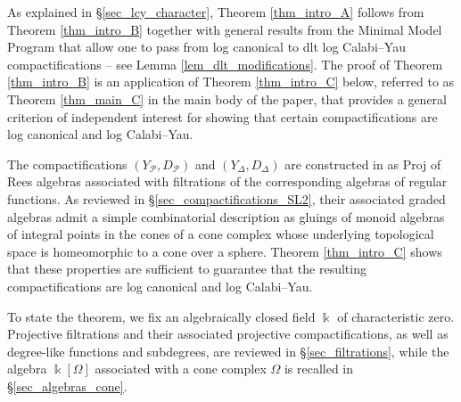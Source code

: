 \documentclass[12pt,letterpaper, reqno]{amsart}
\theoremstyle{defstyle} \newtheorem{definition}[theorem]{Definition}
\theoremstyle{remark}
\numberwithin{equation}{section}
\numberwithin{figure}{section}
\newcommand{\kk} {\Bbbk}
\newcommand{\cP} {\mathcal{P}}
\begin{document}
As explained in \S\ref{sec_lcy_character}, Theorem \ref{thm_intro_A} follows from Theorem \ref{thm_intro_B} together with general results from the Minimal Model Program that allow one to pass from log canonical to dlt log Calabi--Yau compactifications -- see Lemma \ref{lem_dlt_modifications}. The proof of Theorem \ref{thm_intro_B} is an application of Theorem \ref{thm_intro_C} below, referred to as Theorem \ref{thm_main_C} in the main body of the paper, that provides a general criterion of independent interest for showing that certain compactifications are log canonical and log Calabi--Yau.

The compactifications $(Y_\cP,D_\cP)$ and $(Y_\Delta,D_\Delta)$ are constructed in \cite{ayilliath2025geometric, farajzadeh2023compactifications} as Proj of Rees algebras associated with filtrations of the corresponding algebras of regular functions. As reviewed in \S\ref{sec_compactifications_SL2}, their associated graded algebras admit a simple combinatorial description as gluings of monoid algebras of integral points in the cones of a cone complex whose underlying topological space is homeomorphic to a cone over a sphere. Theorem \ref{thm_intro_C} shows that these properties are sufficient to guarantee that the resulting compactifications are log canonical and log Calabi--Yau.

To state the theorem, we fix an algebraically closed field $\kk$ of characteristic zero. Projective filtrations and their associated projective compactifications, as well as degree-like functions and subdegrees, are reviewed in \S\ref{sec_filtrations}, while the algebra $\kk[\Omega]$ associated with a cone complex $\Omega$ is recalled in \S\ref{sec_algebras_cone}.
\end{document}

